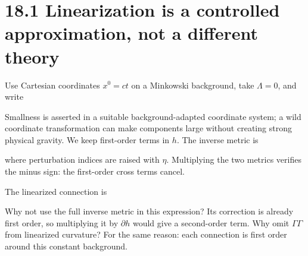 \documentclass[
  11pt,
  letterpaper,
  oneside,
  openany]{scrbook}
\begin{document}
\hypertarget{linearization-is-a-controlled-approximation-not-a-different-theory}{%
\section{18.1 Linearization is a controlled approximation, not a
different
theory}\label{linearization-is-a-controlled-approximation-not-a-different-theory}}

Use Cartesian coordinates \(x^0=ct\) on a Minkowski background, take
\(\Lambda=0\), and write

\begin{center}
\begingroup
{}
\ifdim\wd\grmathbox>\linewidth
\resizebox{\linewidth}{!}{\usebox{\grmathbox}}
\else\usebox{\grmathbox}\fi
\endgroup
\end{center}

Smallness is asserted in a suitable background-adapted coordinate
system; a wild coordinate transformation can make components large
without creating strong physical gravity. We keep first-order terms in
\(h\). The inverse metric is

\begin{center}
\begingroup
{}
\ifdim\wd\grmathbox>\linewidth
\resizebox{\linewidth}{!}{\usebox{\grmathbox}}
\else\usebox{\grmathbox}\fi
\endgroup
\end{center}

where perturbation indices are raised with \(\eta\). Multiplying the two
metrics verifies the minus sign: the first-order cross terms cancel.

The linearized connection is

\begin{center}
\begingroup
{}
\ifdim\wd\grmathbox>\linewidth
\resizebox{\linewidth}{!}{\usebox{\grmathbox}}
\else\usebox{\grmathbox}\fi
\endgroup
\end{center}

Why not use the full inverse metric in this expression? Its correction
is already first order, so multiplying it by \(\partial h\) would give a
second-order term. Why omit \(\Gamma\Gamma\) from linearized curvature?
For the same reason: each connection is first order around this constant
background.
\end{document}
